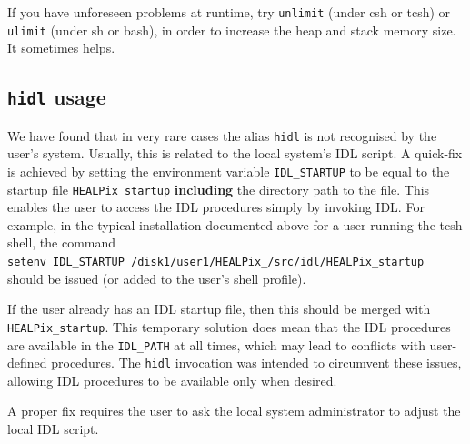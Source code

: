 \documentclass[12pt,twoside]{article}
\begin{document}
If you have unforeseen problems at runtime, try {\tt unlimit} (under csh or tcsh) or {\tt ulimit} (under sh or bash), in order to increase the heap and stack memory size. It
sometimes helps.

\subsection{{\tt hidl} usage}

We have found that in very rare cases the alias {\tt hidl}
is not recognised by the user's system. Usually, this is related
to the local system's IDL script. A quick-fix is achieved
by setting the environment variable {\tt IDL\_STARTUP} to be
equal to the \healpix startup file {\tt HEALPix\_startup}
{\bf including} the directory path to the file. This enables
the user to access the \healpix IDL procedures simply by invoking
IDL. For example, in the typical installation documented
above for a user running the tcsh shell, the command \hfill \\
{\tt setenv IDL\_STARTUP
/disk1/user1/HEALPix\_\hpxversion/src/idl/HEALPix\_startup}
\hfill \\
should be issued (or added to the user's shell profile).

If the user already has an IDL startup file, then
this should be merged with {\tt HEALPix\_startup}. This temporary
solution does mean that the \healpix IDL procedures are available
in the {\tt IDL\_PATH} at all times, which may lead to conflicts with
user-defined procedures. The {\tt hidl} invocation was intended 
to circumvent these issues, allowing \healpix IDL procedures to
be available only when desired.

A proper fix requires the user to ask the local system
administrator to adjust the local IDL script.
\end{document}
